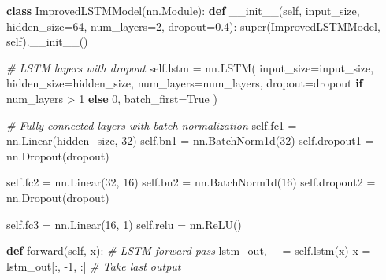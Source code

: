 \documentclass[
]{article}
\newenvironment{Shaded}{}{}
\newcommand{\BuiltInTok}[1]{\textcolor[rgb]{0.00,0.50,0.00}{#1}}
\newcommand{\CommentTok}[1]{\textcolor[rgb]{0.38,0.63,0.69}{\textit{#1}}}
\newcommand{\ControlFlowTok}[1]{\textcolor[rgb]{0.00,0.44,0.13}{\textbf{#1}}}
\newcommand{\DecValTok}[1]{\textcolor[rgb]{0.25,0.63,0.44}{#1}}
\newcommand{\FloatTok}[1]{\textcolor[rgb]{0.25,0.63,0.44}{#1}}
\newcommand{\FunctionTok}[1]{\textcolor[rgb]{0.02,0.16,0.49}{#1}}
\newcommand{\KeywordTok}[1]{\textcolor[rgb]{0.00,0.44,0.13}{\textbf{#1}}}
\newcommand{\NormalTok}[1]{#1}
\newcommand{\OperatorTok}[1]{\textcolor[rgb]{0.40,0.40,0.40}{#1}}
\newcommand{\VariableTok}[1]{\textcolor[rgb]{0.10,0.09,0.49}{#1}}
\begin{document}
\begin{Shaded}
\begin{Highlighting}[]
\KeywordTok{class}\NormalTok{ ImprovedLSTMModel(nn.Module):}
    \KeywordTok{def} \FunctionTok{\_\_init\_\_}\NormalTok{(}\VariableTok{self}\NormalTok{, input\_size, hidden\_size}\OperatorTok{=}\DecValTok{64}\NormalTok{, num\_layers}\OperatorTok{=}\DecValTok{2}\NormalTok{, dropout}\OperatorTok{=}\FloatTok{0.4}\NormalTok{):}
        \BuiltInTok{super}\NormalTok{(ImprovedLSTMModel, }\VariableTok{self}\NormalTok{).}\FunctionTok{\_\_init\_\_}\NormalTok{()}
        
        \CommentTok{\# LSTM layers with dropout}
        \VariableTok{self}\NormalTok{.lstm }\OperatorTok{=}\NormalTok{ nn.LSTM(}
\NormalTok{            input\_size}\OperatorTok{=}\NormalTok{input\_size,}
\NormalTok{            hidden\_size}\OperatorTok{=}\NormalTok{hidden\_size,}
\NormalTok{            num\_layers}\OperatorTok{=}\NormalTok{num\_layers,}
\NormalTok{            dropout}\OperatorTok{=}\NormalTok{dropout }\ControlFlowTok{if}\NormalTok{ num\_layers }\OperatorTok{\textgreater{}} \DecValTok{1} \ControlFlowTok{else} \DecValTok{0}\NormalTok{,}
\NormalTok{            batch\_first}\OperatorTok{=}\VariableTok{True}
\NormalTok{        )}
        
        \CommentTok{\# Fully connected layers with batch normalization}
        \VariableTok{self}\NormalTok{.fc1 }\OperatorTok{=}\NormalTok{ nn.Linear(hidden\_size, }\DecValTok{32}\NormalTok{)}
        \VariableTok{self}\NormalTok{.bn1 }\OperatorTok{=}\NormalTok{ nn.BatchNorm1d(}\DecValTok{32}\NormalTok{)}
        \VariableTok{self}\NormalTok{.dropout1 }\OperatorTok{=}\NormalTok{ nn.Dropout(dropout)}
        
        \VariableTok{self}\NormalTok{.fc2 }\OperatorTok{=}\NormalTok{ nn.Linear(}\DecValTok{32}\NormalTok{, }\DecValTok{16}\NormalTok{)}
        \VariableTok{self}\NormalTok{.bn2 }\OperatorTok{=}\NormalTok{ nn.BatchNorm1d(}\DecValTok{16}\NormalTok{)}
        \VariableTok{self}\NormalTok{.dropout2 }\OperatorTok{=}\NormalTok{ nn.Dropout(dropout)}
        
        \VariableTok{self}\NormalTok{.fc3 }\OperatorTok{=}\NormalTok{ nn.Linear(}\DecValTok{16}\NormalTok{, }\DecValTok{1}\NormalTok{)}
        \VariableTok{self}\NormalTok{.relu }\OperatorTok{=}\NormalTok{ nn.ReLU()}
    
    \KeywordTok{def}\NormalTok{ forward(}\VariableTok{self}\NormalTok{, x):}
        \CommentTok{\# LSTM forward pass}
\NormalTok{        lstm\_out, \_ }\OperatorTok{=} \VariableTok{self}\NormalTok{.lstm(x)}
\NormalTok{        x }\OperatorTok{=}\NormalTok{ lstm\_out[:, }\OperatorTok{{-}}\DecValTok{1}\NormalTok{, :]  }\CommentTok{\# Take last output}
        

\end{Highlighting}
\end{Shaded}
\end{document}
